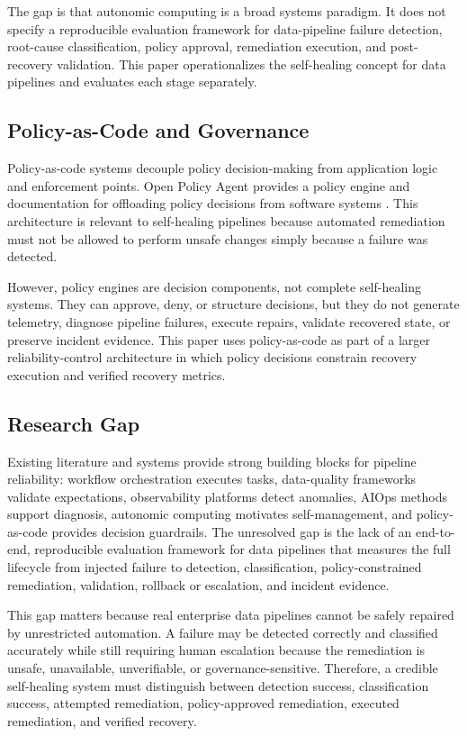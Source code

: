 The gap is that autonomic computing is a broad systems paradigm. It does not specify a reproducible evaluation framework for data-pipeline failure detection, root-cause classification, policy approval, remediation execution, and post-recovery validation. This paper operationalizes the self-healing concept for data pipelines and evaluates each stage separately.

\subsection{Policy-as-Code and Governance}


Policy-as-code systems decouple policy decision-making from application logic and enforcement points. Open Policy Agent provides a policy engine and documentation for offloading policy decisions from software systems \cite{opa2026docs}. This architecture is relevant to self-healing pipelines because automated remediation must not be allowed to perform unsafe changes simply because a failure was detected.

However, policy engines are decision components, not complete self-healing systems. They can approve, deny, or structure decisions, but they do not generate telemetry, diagnose pipeline failures, execute repairs, validate recovered state, or preserve incident evidence. This paper uses policy-as-code as part of a larger reliability-control architecture in which policy decisions constrain recovery execution and verified recovery metrics.

\subsection{Research Gap}


Existing literature and systems provide strong building blocks for pipeline reliability: workflow orchestration executes tasks, data-quality frameworks validate expectations, observability platforms detect anomalies, AIOps methods support diagnosis, autonomic computing motivates self-management, and policy-as-code provides decision guardrails. The unresolved gap is the lack of an end-to-end, reproducible evaluation framework for data pipelines that measures the full lifecycle from injected failure to detection, classification, policy-constrained remediation, validation, rollback or escalation, and incident evidence.

This gap matters because real enterprise data pipelines cannot be safely repaired by unrestricted automation. A failure may be detected correctly and classified accurately while still requiring human escalation because the remediation is unsafe, unavailable, unverifiable, or governance-sensitive. Therefore, a credible self-healing system must distinguish between detection success, classification success, attempted remediation, policy-approved remediation, executed remediation, and verified recovery.
